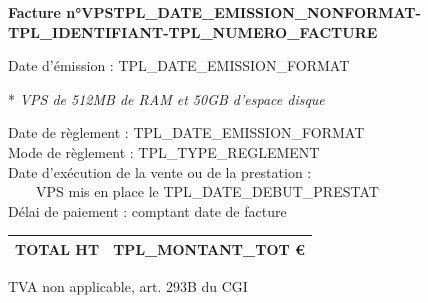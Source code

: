 \documentclass[10pt,a4paper]{article}
\begin{document}
\vspace{0.5cm}

\textbf{Facture n°VPSTPL_DATE_EMISSION_NONFORMAT-TPL_IDENTIFIANT-TPL_NUMERO_FACTURE}

Date d'émission : TPL_DATE_EMISSION_FORMAT\\

\vspace{0.5cm}


* \textit{VPS de 512MB de RAM et 50GB d'espace disque}

\vspace{0.5cm}

\begin{multicols}{2}

    \begin{flushleft}

        Date de règlement : TPL_DATE_EMISSION_FORMAT\\
        Mode de règlement : TPL_TYPE_REGLEMENT\\
        Date d’exécution de la vente ou de la prestation : \\
        ~~~~VPS mis en place le TPL_DATE_DEBUT_PRESTAT\\
        Délai de paiement : comptant date de facture

    \end{flushleft}

    \columnbreak

    \begin{flushright}

        \begin{tabular}{ |l|l| }
            \hline
            TOTAL HT & TPL_MONTANT_TOT \euro{} \\
            \hline
        \end{tabular}

        TVA non applicable, art. 293B du CGI
    \end{flushright}

\end{multicols}
\end{document}
